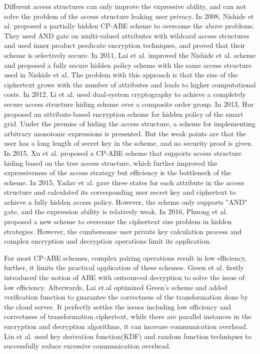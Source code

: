 \documentclass[smallextended]{svjour3}       %
\begin{document}
	Different access structures can only improve the expressive ability, and can not solve the problem of the access structure leaking user privacy.
	In 2008, Nishide et al. proposed a partially hidden CP-ABE scheme to overcome the above problems. 
	They used AND gate on multi-valued attributes with wildcard access structures and used inner product predicate encryption techniques, and proved that their scheme is selectively secure. 
	In 2011, Lai et al. improved the Nishide et al. scheme and proposed a fully secure hidden policy scheme with the same access structure used in Nishide et al. 
	The problem with this approach is that the size of the ciphertext grows with the number of attributes and leads to higher computational costs. 
	In 2012, Li et al. used dual-system cryptography to achieve a completely secure access structure hiding scheme over a composite order group. 
	In 2013, Hur proposed an attribute-based encryption scheme for hidden policy of the smart grid. 
	Under the premise of hiding the access structure, a scheme for implementing arbitrary monotonic expressions is presented. 
	But the weak points are that the user has a long length of secret key in the scheme, and no security proof is given. 
	In 2015, Xu et al. proposed a CP-ABE scheme that supports access structure hiding based on the tree access structure, which further improved the expressiveness of the access strategy but efficiency is the bottleneck of the scheme. 
	In 2015, Yadav et al. gave three states for each attribute in the access structure and calculated its corresponding user secret key and ciphertext to achieve a fully hidden access policy. 
	However, the scheme only supports "AND" gate, and the expression ability is relatively weak. 
	In 2016, Phuong et al. proposed a new scheme to overcome the ciphertext size problem in hidden strategies. 
	However, the cumbersome user private key calculation process and complex encryption and decryption operations limit its application.

	For most CP-ABE schemes, complex pairing operations result in low efficiency, further, it limits the practical application of these schemes.
	Green et al. firstly introduced the notion of ABE with outsourced decryption to solve the issue of low efficiency. 
	Afterwards, Lai et.al optimized Green's scheme and added verification function to guarantee the correctness of the transformation done by the cloud server.
	It perfectly settles the issues including low efficiency and correctness of transformation ciphertext, while there are parallel instances in the encryption and decryption algorithms, it can increase communication overhead.
	Lin et al. used key derivation function(KDF) and random function techniques to successfully reduce excessive communication overhead.
\end{document}
